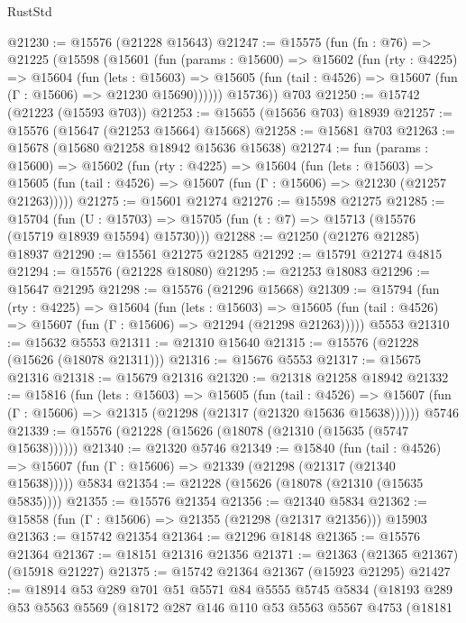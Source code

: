 \begin{lexlean}{RustStd}
\begin{coremodule}
@21230 := @15576 (@21228 @15643)
@21247 := @15575
    (fun (fn : @76) =>
    @21225
      (@15598
        (@15601
          (fun (params : @15600) =>
          @15602
            (fun (rty : @4225) =>
            @15604
              (fun (lets : @15603) =>
              @15605 (fun (tail : @4526) => @15607 (fun (Γ : @15606) => @21230 @15690))))))
        @15736))
    @703
@21250 := @15742 (@21223 (@15593 @703))
@21253 := @15655 (@15656 @703) @18939
@21257 := @15576 (@15647 (@21253 @15664) @15668)
@21258 := @15681 @703
@21263 := @15678 (@15680 @21258 @18942 @15636 @15638)
@21274 := fun (params : @15600) =>
  @15602
    (fun (rty : @4225) =>
    @15604
      (fun (lets : @15603) =>
      @15605 (fun (tail : @4526) => @15607 (fun (Γ : @15606) => @21230 (@21257 @21263)))))
@21275 := @15601 @21274
@21276 := @15598 @21275
@21285 := @15704
    (fun (U : @15703) => @15705 (fun (t : @7) => @15713 (@15576 (@15719 @18939 @15594) @15730)))
@21288 := @21250 (@21276 @21285) @18937
@21290 := @15561 @21275 @21285
@21292 := @15791 @21274 @4815
@21294 := @15576 (@21228 @18080)
@21295 := @21253 @18083
@21296 := @15647 @21295
@21298 := @15576 (@21296 @15668)
@21309 := @15794
    (fun (rty : @4225) =>
    @15604
      (fun (lets : @15603) =>
      @15605 (fun (tail : @4526) => @15607 (fun (Γ : @15606) => @21294 (@21298 @21263)))))
    @5553
@21310 := @15632 @5553
@21311 := @21310 @15640
@21315 := @15576 (@21228 (@15626 (@18078 @21311)))
@21316 := @15676 @5553
@21317 := @15675 @21316
@21318 := @15679 @21316
@21320 := @21318 @21258 @18942
@21332 := @15816
    (fun (lets : @15603) =>
    @15605
      (fun (tail : @4526) =>
      @15607 (fun (Γ : @15606) => @21315 (@21298 (@21317 (@21320 @15636 @15638))))))
    @5746
@21339 := @15576 (@21228 (@15626 (@18078 (@21310 (@15635 (@5747 @15638))))))
@21340 := @21320 @5746
@21349 := @15840
    (fun (tail : @4526) => @15607 (fun (Γ : @15606) => @21339 (@21298 (@21317 (@21340 @15638)))))
    @5834
@21354 := @21228 (@15626 (@18078 (@21310 (@15635 @5835))))
@21355 := @15576 @21354
@21356 := @21340 @5834
@21362 := @15858 (fun (Γ : @15606) => @21355 (@21298 (@21317 @21356))) @15903
@21363 := @15742 @21354
@21364 := @21296 @18148
@21365 := @15576 @21364
@21367 := @18151 @21316 @21356
@21371 := @21363 (@21365 @21367) (@15918 @21227)
@21375 := @15742 @21364 @21367 (@15923 @21295)
@21427 := @18914
    @53
    @289
    @701
    @51
    @5571
    @84
    @5555
    @5745
    @5834
    (@18193
      @289
      @53
      @5563
      @5569
      (@18172
        @287
        @146
        @110
        @53
        @5563
        @5567
        @4753
        (@18181

\end{coremodule}
\end{lexlean}

